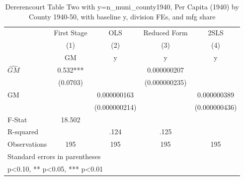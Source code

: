 \begin{table}[htbp]\centering
\def\sym#1{\ifmmode^{#1}\else\(^{#1}\)\fi}
\caption{Dererencourt Table Two with y=n\_muni\_county1940, Per Capita (1940) by County 1940-50, with baseline y, division FEs, and mfg share}
\begin{tabular}{l*{4}{c}}
\toprule
                    & First Stage   &         OLS   &Reduced Form   &        2SLS   \\
                    &\multicolumn{1}{c}{(1)}&\multicolumn{1}{c}{(2)}&\multicolumn{1}{c}{(3)}&\multicolumn{1}{c}{(4)}\\
                    &\multicolumn{1}{c}{GM}&\multicolumn{1}{c}{y}&\multicolumn{1}{c}{y}&\multicolumn{1}{c}{y}\\
\midrule
$\hat{GM}$          &       0.532***&               & 0.000000207   &               \\
                    &    (0.0703)   &               &(0.000000235)   &               \\
\addlinespace
GM                  &               & 0.000000163   &               & 0.000000389   \\
                    &               &(0.000000214)   &               &(0.000000436)   \\
\midrule
F-Stat              &      18.502   &               &               &               \\
R-squared           &               &        .124   &        .125   &               \\
Observations        &         195   &         195   &         195   &         195   \\
\bottomrule
\multicolumn{5}{l}{\footnotesize Standard errors in parentheses}\\
\multicolumn{5}{l}{\footnotesize * p<0.10, ** p<0.05, *** p<0.01}\\
\end{tabular}
\end{table}
